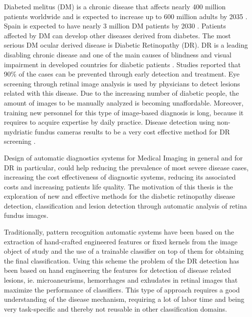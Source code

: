 Diabeted melitus (DM) is a chronic disease that affects nearly 400 million patients worldwide and is expected to increase up to 600 million adults by 2035 \citep{aguiree2013idf}. Spain is expected to have nearly 3 million DM patients by 2030 \citep{shaw2010global}. Patients affected by DM can develop other diseases derived from diabetes. The most serious DM ocular derived disease is Diabetic Retinopathy (DR). DR is a leading disabling chronic disease  and one of the main causes of blindness and visual impairment in developed countries for diabetic patients \citep{fong2004retinopathy}. Studies reported that 90\% of the cases can be prevented through early detection and treatment. Eye screening through retinal image analysis is used by physicians to detect lesions related with this disease. Due to the increasing number of diabetic people, the amount of images to be manually analyzed is becoming unaffordable. Moreover, training new personnel for this type of image-based diagnosis is long, because it requires to acquire expertise by daily practice. Disease detection using non-mydriatic fundus cameras results to be a very cost effective method for DR screening \citep{romero2018clinical}.  

Design of automatic diagnostics systems for Medical Imaging in general and for DR in particular, could help reducing the prevalence of most severe disease cases, increasing the cost effectiveness of diagnostic systems, reducing its associated costs and increasing patients life quality. The motivation of this thesis is the exploration of new and effective methods for the diabetic retinopathy disease detection, classification and lesion detection through automatic analysis of retina fundus images.

Traditionally, pattern recognition automatic systems have been based on the extraction of hand-crafted engineered features or fixed kernels from the image object of study and the use of a trainable classifier on top of them for obtaining the final classification. Using this scheme the problem of the DR detection has been based on hand engineering the features for detection of disease related lesions, ie. microaneurisms, hemorrhages and exhudates in retinal images that maximize the performance of classifiers. This type of approach requires a good understanding of the disease mechanism, requiring a lot of labor time and being very task-specific and thereby not reusable in other classification domains.

